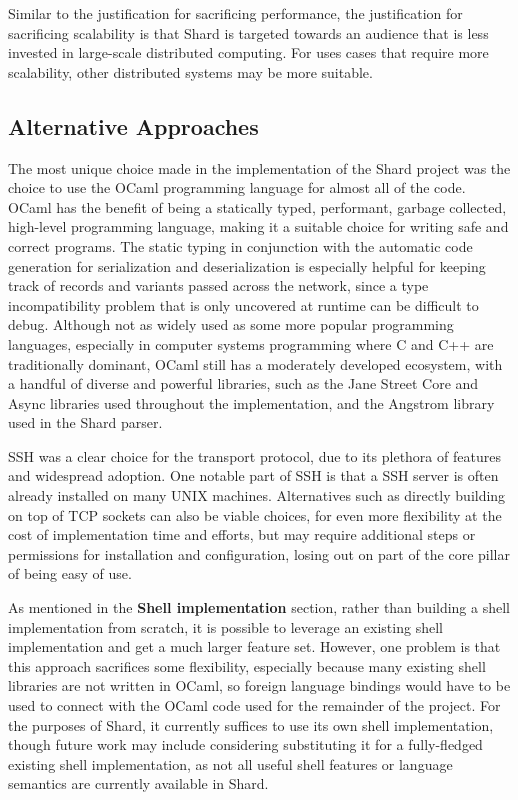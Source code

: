 \documentclass[oneside]{report}
\begin{document}
Similar to the justification for sacrificing performance, the justification for sacrificing scalability is that Shard is targeted towards an audience that is less invested in large-scale distributed computing.
For uses cases that require more scalability, other distributed systems may be more suitable.

\subsection{Alternative Approaches}

The most unique choice made in the implementation of the Shard project was the choice to use the OCaml programming language for almost all of the code.
OCaml has the benefit of being a statically typed, performant, garbage collected, high-level programming language, making it a suitable choice for writing safe and correct programs.
The static typing in conjunction with the automatic code generation for serialization and deserialization is especially helpful for keeping track of records and variants passed across the network, since a type incompatibility problem that is only uncovered at runtime can be difficult to debug.
Although not as widely used as some more popular programming languages, especially in computer systems programming where C and C++ are traditionally dominant, OCaml still has a moderately developed ecosystem, with a handful of diverse and powerful libraries, such as the Jane Street Core and Async libraries used throughout the implementation, and the Angstrom library used in the Shard parser.

SSH was a clear choice for the transport protocol, due to its plethora of features and widespread adoption.
One notable part of SSH is that a SSH server is often already installed on many UNIX machines.
Alternatives such as directly building on top of TCP sockets can also be viable choices, for even more flexibility at the cost of implementation time and efforts, but may require additional steps or permissions for installation and configuration, losing out on part of the core pillar of being easy of use.

As mentioned in the \textbf{Shell implementation} section, rather than building a shell implementation from scratch, it is possible to leverage an existing shell implementation and get a much larger feature set.
However, one problem is that this approach sacrifices some flexibility, especially because many existing shell libraries are not written in OCaml, so foreign language bindings would have to be used to connect with the OCaml code used for the remainder of the project.
For the purposes of Shard, it currently suffices to use its own shell implementation, though future work may include considering substituting it for a fully-fledged existing shell implementation, as not all useful shell features or language semantics are currently available in Shard.
\end{document}
